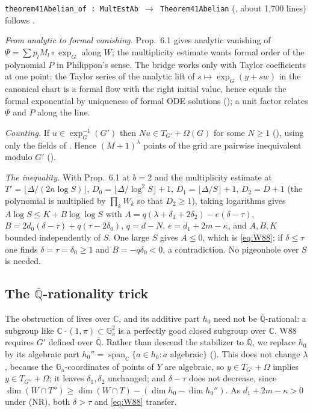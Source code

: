 \documentclass[11pt]{amsart}
\theoremstyle{definition}
\theoremstyle{remark}
\numberwithin{equation}{section}
\newcommand{\CC}{\mathbb{C}}
\newcommand{\Qbar}{\overline{\mathbb{Q}}}
\newcommand{\Ga}{\mathbb{G}_{\mathrm{a}}}
\newcommand{\NR}{\textup{(NR)}}
\begin{document}
\texttt{theorem41Abelian\_of\ :\ MultEstAb\ }$\to$\texttt{\ Theorem41Abelian} (, about 1{,}700
lines) follows \cite[pp.~396--397]{W88}.

\emph{From analytic to formal vanishing.} Prop.~6.1 gives analytic vanishing of $\Psi=\sum p_l M_l\circ\exp_G$
along $W$; the multiplicity estimate wants formal order of the polynomial $P$ in Philippon's sense.
The bridge  works only with Taylor coefficients at one point: the Taylor series
of the analytic lift of $s\mapsto\exp_G(y+sw)$ in the canonical chart is a formal flow with the right
initial value, hence equals the formal exponential by uniqueness of formal ODE solutions
(); a unit factor relates $\Psi$ and $P$ along the line.

\emph{Counting.} If $u\in\exp_G^{-1}(G')$ then $Nu\in T_{G'}+\Omega(G)$ for some $N\ge1$ (),
using only the fields of . Hence $(M+1)^\lambda$ points of the grid are pairwise
inequivalent modulo $G'$ ().

\emph{The inequality.} With Prop.~6.1 at $b=2$ and the multiplicity estimate at
$T'=\lfloor\Delta/(2n\log S)\rfloor$, $D_0=\lfloor\Delta/\log^2S\rfloor+1$, $D_1=\lfloor\Delta/S\rfloor+1$, $D_2=D+1$
(the polynomial is multiplied by $\prod_kW_k$ so that $D_2\ge1$), taking logarithms gives $A\log S\le
K+B\log\log S$ with $A=q(\lambda+\delta_1+2\delta_2)-e(\delta-\tau)$, $B=2d_0(\delta-\tau)+q(\tau-2\delta_0)$, $q=d-N$,
$e=d_1+2m-\kappa$, and $A,B,K$ bounded independently of $S$. One large $S$ gives $A\le0$, which is
\eqref{eq:W88}; if $\delta\le\tau$ one finds $\delta=\tau=\delta_0\ge1$ and $B=-q\delta_0<0$, a contradiction. No
pigeonhole over $S$ is needed.

\subsection{The $\Qbar$-rationality trick}\label{sec:rat}
The obstruction of  lives over $\CC$, and its additive part $h_0$ need not be
$\Qbar$-rational: a subgroup like $\CC\cdot(1,\pi)\subset\Ga^2$ is a perfectly good closed subgroup over $\CC$.
W88 requires $G'$ defined over $\Qbar$. Rather than descend the stabilizer to $\Qbar$, we replace $h_0$ by
its algebraic part $h_0''=\operatorname{span}_\CC\{a\in h_0: a\text{ algebraic}\}$ ().
This does not change $\lambda$, because the $\Ga$-coordinates of points of $Y$ are algebraic, so $y\in
T_{G'}+\Omega$ implies $y\in T_{G''}+\Omega$; it leaves $\delta_1,\delta_2$ unchanged; and $\delta-\tau$ does not decrease,
since $\dim(W\cap T'')\ge\dim(W\cap T)-(\dim h_0-\dim h_0'')$. As $d_1+2m-\kappa>0$ under \NR, both $\delta>\tau$ and
\eqref{eq:W88} transfer.
\end{document}
